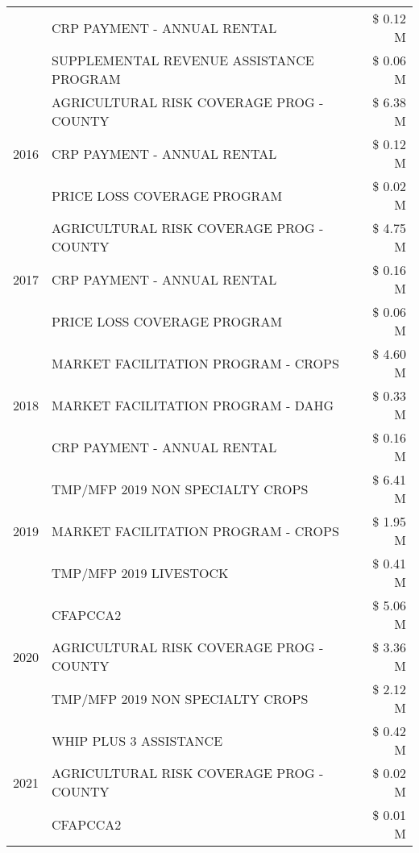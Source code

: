 \begin{tabular}{llr}
 & CRP PAYMENT - ANNUAL RENTAL & \$ 0.12 M \\
 & SUPPLEMENTAL REVENUE ASSISTANCE PROGRAM & \$ 0.06 M \\
\cline{1-3}
\multirow[t]{3}{*}{2016} & AGRICULTURAL RISK COVERAGE PROG - COUNTY & \$ 6.38 M \\
 & CRP PAYMENT - ANNUAL RENTAL & \$ 0.12 M \\
 & PRICE LOSS COVERAGE PROGRAM & \$ 0.02 M \\
\cline{1-3}
\multirow[t]{3}{*}{2017} & AGRICULTURAL RISK COVERAGE PROG - COUNTY & \$ 4.75 M \\
 & CRP PAYMENT - ANNUAL RENTAL & \$ 0.16 M \\
 & PRICE LOSS COVERAGE PROGRAM & \$ 0.06 M \\
\cline{1-3}
\multirow[t]{3}{*}{2018} & MARKET FACILITATION PROGRAM - CROPS & \$ 4.60 M \\
 & MARKET FACILITATION PROGRAM - DAHG & \$ 0.33 M \\
 & CRP PAYMENT - ANNUAL RENTAL & \$ 0.16 M \\
\cline{1-3}
\multirow[t]{3}{*}{2019} & TMP/MFP 2019 NON SPECIALTY CROPS & \$ 6.41 M \\
 & MARKET FACILITATION PROGRAM - CROPS & \$ 1.95 M \\
 & TMP/MFP 2019 LIVESTOCK & \$ 0.41 M \\
\cline{1-3}
\multirow[t]{3}{*}{2020} & CFAPCCA2 & \$ 5.06 M \\
 & AGRICULTURAL RISK COVERAGE PROG - COUNTY & \$ 3.36 M \\
 & TMP/MFP 2019 NON SPECIALTY CROPS & \$ 2.12 M \\
\cline{1-3}
\multirow[t]{3}{*}{2021} & WHIP PLUS 3 ASSISTANCE & \$ 0.42 M \\
 & AGRICULTURAL RISK COVERAGE PROG - COUNTY & \$ 0.02 M \\
 & CFAPCCA2 & \$ 0.01 M \\
\cline{1-3}
\bottomrule
\end{tabular}
